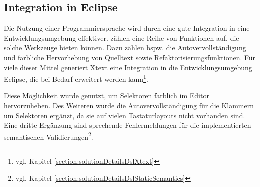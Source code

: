 \subsection{Integration in Eclipse}
    Die Nutzung einer Programmiersprache wird durch eine gute Integration in eine
    Entwicklungsumgebung effektiver.
    \citet[Kapitel 12.]{voelter:DslEngineering} zählen eine Reihe von
    Funktionen auf, die solche Werkzeuge bieten können.
    Dazu zählen bspw. die Autovervollständigung und farbliche Hervorhebung von Quelltext
    sowie Refaktorisierungsfunktionen.
    Für viele dieser Mittel generiert Xtext eine Integration
    in die Entwicklungsumgebung Eclipse,
    die bei Bedarf erweitert werden kann\footnote{vgl. Kapitel \ref{section:solutionDetailsDslXtext}}.

    Diese Möglichkeit wurde genutzt, um Selektoren farblich im Editor hervorzuheben.
    Des Weiteren wurde die Autovervollständigung für die Klammern um Selektoren ergänzt,
    da sie auf vielen Tastaturlayouts nicht vorhanden sind.
    Eine dritte Ergänzung sind sprechende Fehlermeldungen für die implementierten
    semantischen Validierungen\footnote{vgl. Kapitel \ref{section:solutionDetailsDslStaticSemantics}}.
